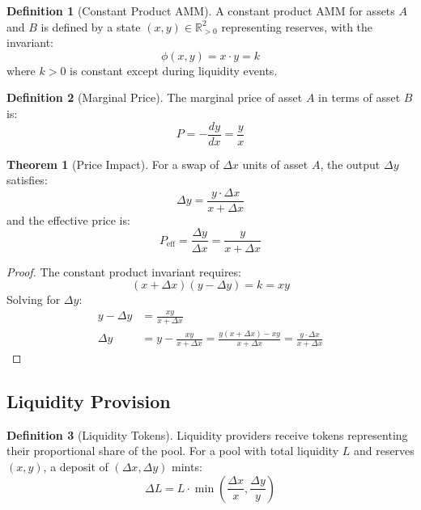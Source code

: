 \documentclass[11pt,a4paper]{article}
\theoremstyle{definition}
\newtheorem{definition}{Definition}
\newtheorem{theorem}{Theorem}
\begin{document}
\begin{definition}[Constant Product AMM]
A constant product AMM for assets $A$ and $B$ is defined by a state $(x, y) \in \mathbb{R}_{>0}^2$ representing reserves, with the invariant:
\begin{equation}
\phi(x, y) = x \cdot y = k
\end{equation}
where $k > 0$ is constant except during liquidity events.
\end{definition}

\begin{definition}[Marginal Price]
The marginal price of asset $A$ in terms of asset $B$ is:
\begin{equation}
P = -\frac{dy}{dx} = \frac{y}{x}
\end{equation}
\end{definition}

\begin{theorem}[Price Impact]
For a swap of $\Delta x$ units of asset $A$, the output $\Delta y$ satisfies:
\begin{equation}
\Delta y = \frac{y \cdot \Delta x}{x + \Delta x}
\end{equation}
and the effective price is:
\begin{equation}
P_{\text{eff}} = \frac{\Delta y}{\Delta x} = \frac{y}{x + \Delta x}
\end{equation}
\end{theorem}

\begin{proof}
The constant product invariant requires:
\begin{equation}
(x + \Delta x)(y - \Delta y) = k = xy
\end{equation}
Solving for $\Delta y$:
\begin{align}
y - \Delta y &= \frac{xy}{x + \Delta x} \\
\Delta y &= y - \frac{xy}{x + \Delta x} = \frac{y(x + \Delta x) - xy}{x + \Delta x} = \frac{y \cdot \Delta x}{x + \Delta x}
\end{align}
\end{proof}

\subsection{Liquidity Provision}

\begin{definition}[Liquidity Tokens]
Liquidity providers receive tokens representing their proportional share of the pool. For a pool with total liquidity $L$ and reserves $(x, y)$, a deposit of $(\Delta x, \Delta y)$ mints:
\begin{equation}
\Delta L = L \cdot \min\left(\frac{\Delta x}{x}, \frac{\Delta y}{y}\right)
\end{equation}
\end{definition}
\end{document}
